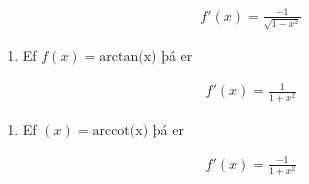 \documentclass[a4paper,10pt,icelandic]{sphinxmanual}
\begin{document}
\begin{equation*}
\begin{split}f'(x)=\frac{-1}{\sqrt{1-x^2}}\end{split}
\end{equation*}\begin{enumerate}
%
\setcounter{enumi}{15}
\item {} 
Ef \(f(x)=\text{arctan(x)}\) þá er

\end{enumerate}
\begin{equation*}
\begin{split}f'(x)=\frac{1}{1+x^2}\end{split}
\end{equation*}\begin{enumerate}
%
\setcounter{enumi}{16}
\item {} 
Ef \((x)=\text{arccot(x)}\) þá er

\end{enumerate}
\begin{equation*}
\begin{split}f'(x)=\frac{-1}{1+x^2}\end{split}
\end{equation*}
\end{document}
